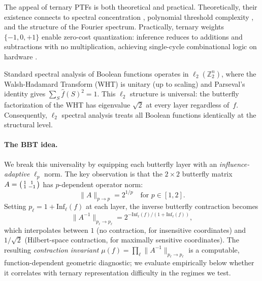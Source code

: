 \documentclass[11pt]{article}
\newcommand{\Inf}{\mathrm{Inf}}
\begin{document}
The appeal of ternary PTFs is both theoretical and practical. Theoretically, their existence connects to spectral concentration \cite{linial1993constant}, polynomial threshold complexity \cite{odonnell2014analysis}, and the structure of the Fourier spectrum. Practically, ternary weights $\{-1,0,+1\}$ enable zero-cost quantization: inference reduces to additions and subtractions with no multiplication, achieving single-cycle combinational logic on hardware \cite{courbariaux2016binarized}.

Standard spectral analysis of Boolean functions operates in $\ell_2(\mathbb{Z}_2^n)$, where the Walsh-Hadamard Transform (WHT) is unitary (up to scaling) and Parseval's identity gives $\sum_S \hat{f}(S)^2 = 1$. This $\ell_2$ structure is universal: the butterfly factorization of the WHT has eigenvalue $\sqrt{2}$ at every layer regardless of~$f$. Consequently, $\ell_2$ spectral analysis treats all Boolean functions identically at the structural level.

\paragraph{The BBT idea.} We break this universality by equipping each butterfly layer with an \emph{influence-adaptive} $\ell_p$ norm. The key observation is that the $2 \times 2$ butterfly matrix $A = \begin{psmallmatrix} 1 & 1 \\ 1 & -1 \end{psmallmatrix}$ has $p$-dependent operator norm:
\begin{equation}
\label{eq:butterfly_norm}
    \|A\|_{p \to p} = 2^{1/p} \quad \text{for } p \in [1,2].
\end{equation}
Setting $p_\ell = 1 + \Inf_\ell(f)$ at each layer, the inverse butterfly contraction becomes
\[
\|A^{-1}\|_{p_\ell \to p_\ell} = 2^{-\Inf_\ell(f)/(1+\Inf_\ell(f))},
\]
which interpolates between $1$ (no contraction, for insensitive coordinates) and $1/\sqrt{2}$ (Hilbert-space contraction, for maximally sensitive coordinates). The resulting \emph{contraction invariant} $\mu(f) = \prod_\ell \|A^{-1}\|_{p_\ell \to p_\ell}$ is a computable, function-dependent geometric diagnostic; we evaluate empirically below whether it correlates with ternary representation difficulty in the regimes we test.
\end{document}
